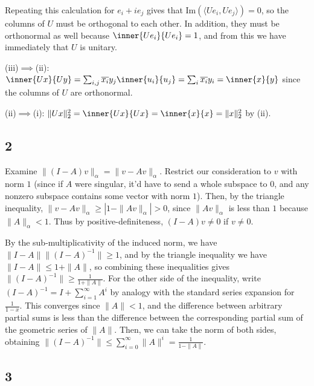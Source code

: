 \documentclass{article}
\newcommand{\conj}{\overline}
\begin{document}
Repeating this calculation for $e_i+ie_j$ gives that $\text{Im}(\langle Ue_i,Ue_j\rangle)=0$, so the columns of $U$ must be orthogonal to each other. In addition, they must be orthonormal as well because $\inner{Ue_i}{Ue_i}=1$, and from this we have immediately that $U$ is unitary.

(iii)$\implies$(ii): $\inner{Ux}{Uy}=\sum_{i,j}\conj{x_i}y_j\inner{u_i}{u_j}=\sum_i\conj{x_i}y_i=\inner{x}{y}$ since the columns of $U$ are orthonormal.

(ii)$\implies$(i): $\|Ux\|_2^2=\inner{Ux}{Ux}=\inner{x}{x}=\|x\|_2^2$ by (ii).
\subsection*{2}
Examine $\|(I-A)v\|_\alpha=\|v-Av\|_\alpha$. Restrict our consideration to $v$ with norm $1$ (since if $A$ were singular, it'd have to send a whole subspace to $0$, and any nonzero subspace contains some vector with norm $1$). Then, by the triangle inequality, $\|v-Av\|_\alpha\geq\left|1-\|Av\|_\alpha\right|>0$, since $\|Av\|_\alpha$ is less than $1$ because $\|A\|_\alpha<1$. Thus by positive-definiteness, $(I-A)v\neq0$ if $v\neq0$.

By the sub-multiplicativity of the induced norm, we have $\|I-A\|\|(I-A)^{-1}\|\geq1$, and by the triangle inequality we have $\|I-A\|\leq1+\|A\|$, so combining these inequalities gives $\|(I-A)^{-1}\|\geq\frac{1}{1+\|A\|}$. For the other side of the inequality, write $(I-A)^{-1}=I+\sum_{i=1}^\infty A^i$ by analogy with the standard series expansion for $\frac{1}{1-x}$. This converges since $\|A\|<1$, and the difference between arbitrary partial sums is less than the difference between the corresponding partial sum of the geometric series of $\|A\|$. Then, we can take the norm of both sides, obtaining $\|(I-A)^{-1}\|\leq\sum_{i=0}^\infty\|A\|^i=\frac{1}{1-\|A\|}$.
\subsection*{3}
\end{document}

